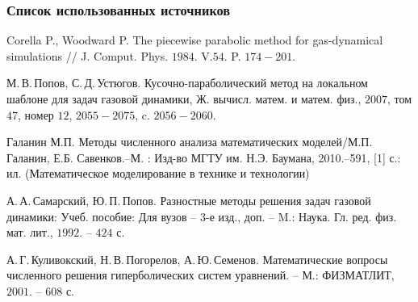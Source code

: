 \documentclass[unicode, 8pt]{beamer}
\begin{document}
    \begin{frame}
        \frametitle{Список использованных источников}
        \begin{thebibliography}{9}
  
             Corella P., Woodward P. The piecewise parabolic method for gas-dynamical simulations // J. Comput. Phys. $1984$. V.$54$. P. $174-201$.
      
             М.\,В.\,Попов, С.\,Д.\,Устюгов. Кусочно-параболический метод на локальном шаблоне для задач газовой динамики, Ж. вычисл. матем. и матем. физ., $2007$, том $47$, номер $12$, $2055-2075$, c. $2056-2060$.
      
             Галанин М.П. Методы численного анализа математических моделей/М.П. Галанин, Е.Б. Савенков.–М. : Изд-во МГТУ им. Н.Э. Баумана, 2010.–591, [1] с.: ил. (Математическое моделирование в технике и технологии)
    
             А.\,А.\,Самарский, Ю.\,П.\,Попов. Разностные методы решения задач газовой динамики: Учеб. пособие: Для вузов -- $3$-е изд., доп. -- M.: Наука. Гл. ред. физ. мат. лит., $1992$. -- $424$ с.
    
             А.\,Г.\,Куливокский, Н.\,В.\,Погорелов, А.\,Ю.\,Семенов. Математические вопросы численного решения гиперболических систем уравнений. -- М.: ФИЗМАТЛИТ, $2001$. -- $608$ с.
      
        \end{thebibliography}
    \end{frame}
\end{document}
